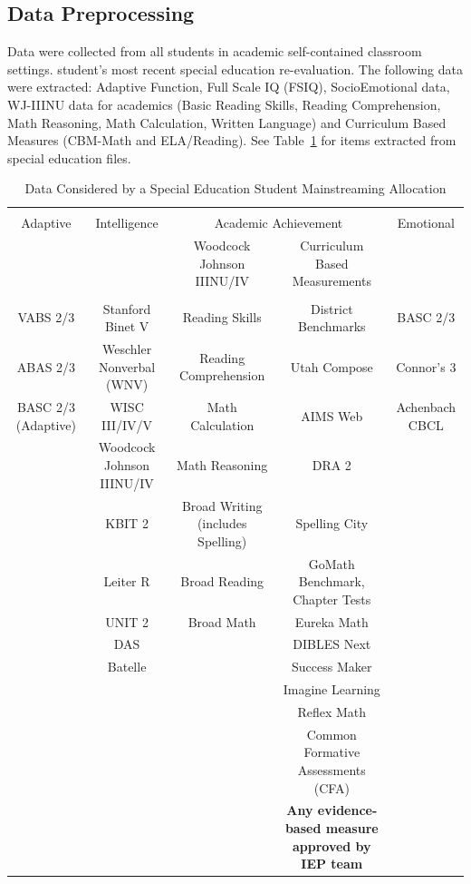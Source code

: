 \documentclass[twoside]{article}
\begin{document}
\subsection{Data Preprocessing}
Data were collected from all students in academic self-contained classroom settings.  student's most recent special education re-evaluation. The following data were extracted: Adaptive Function, Full Scale IQ (FSIQ), SocioEmotional data, WJ-IIINU data for academics (Basic Reading Skills, Reading Comprehension, Math Reasoning, Math Calculation, Written Language) and Curriculum Based Measures (CBM-Math and ELA/Reading). See Table~\ref{tab1} for items extracted from special education files.
%
%
%
%
\begin{table}[tbp!]
	\centering
	\vspace*{0cm}\caption{Data Considered by a Special Education Student Mainstreaming Allocation}
	\label{tab1}
	\resizebox{\textwidth}{!}
	{\begin{tabular}{ccccc}
			\hline\\[-1.5ex]
			Adaptive & Intelligence & \multicolumn{2}{c}{Academic Achievement} & Emotional \\[0.5ex]
			\cmidrule(lr){3-4}
			& & Woodcock Johnson IIINU/IV & Curriculum Based Measurements & \\
			\hline\\[-1.5ex]
			VABS 2/3 & Stanford Binet V & Reading Skills & District Benchmarks & BASC 2/3\\
			ABAS 2/3 & Weschler Nonverbal (WNV) & Reading Comprehension & Utah Compose & Connor's 3\\
			BASC 2/3 (Adaptive) & WISC III/IV/V & Math Calculation & AIMS Web & Achenbach CBCL\\
			& Woodcock Johnson IIINU/IV & Math Reasoning & DRA 2 & \\
			& KBIT 2 & Broad Writing (includes Spelling) & Spelling City & \\
			& Leiter R & Broad Reading & GoMath Benchmark, Chapter Tests & \\
			& UNIT 2 & Broad Math & Eureka Math &\\
			& DAS & & DIBLES Next &\\
			& Batelle & & Success Maker &\\
			& & & Imagine Learning &\\
			& & & Reflex Math &\\
			& & & Common Formative Assessments (CFA) &\\
			& & & \textbf{Any evidence-based measure approved by IEP team} &\\
			\hline
	\end{tabular}}
\end{table}
\end{document}
